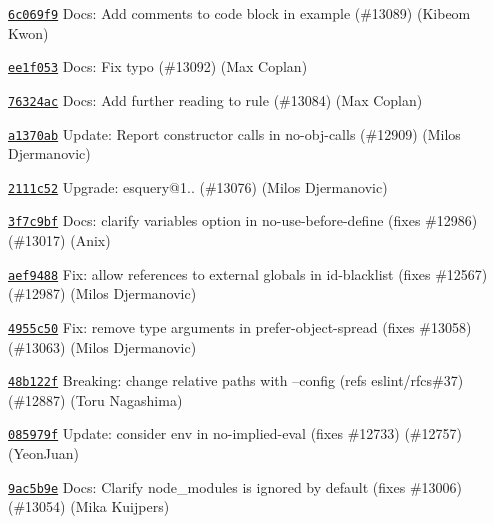 \begin{DoxyItemize}
\item \href{https://github.com/eslint/eslint/commit/6c069f907a04268b671c7f949c04a508df9d42a3}{\texttt{ {\ttfamily 6c069f9}}} Docs\+: Add comments to code block in example (\#13089) (Kibeom Kwon)
\item \href{https://github.com/eslint/eslint/commit/ee1f0531aa534ef9182cf8586f55ad82aaa55e75}{\texttt{ {\ttfamily ee1f053}}} Docs\+: Fix typo (\#13092) (Max Coplan)
\item \href{https://github.com/eslint/eslint/commit/76324ace67893c3d7e38a369114d6128df9ffb65}{\texttt{ {\ttfamily 76324ac}}} Docs\+: Add further reading to rule (\#13084) (Max Coplan)
\item \href{https://github.com/eslint/eslint/commit/a1370abed72e1fb93e601816d981fa6e46204afb}{\texttt{ {\ttfamily a1370ab}}} Update\+: Report constructor calls in no-\/obj-\/calls (\#12909) (Milos Djermanovic)
\item \href{https://github.com/eslint/eslint/commit/2111c52443e7641caad291e0daaea8e2fe6c4562}{\texttt{ {\ttfamily 2111c52}}} Upgrade\+: esquery@1.. (\#13076) (Milos Djermanovic)
\item \href{https://github.com/eslint/eslint/commit/3f7c9bf19615122fb776cdd13da532d860bd945a}{\texttt{ {\ttfamily 3f7c9bf}}} Docs\+: clarify variables option in no-\/use-\/before-\/define (fixes \#12986) (\#13017) (Anix)
\item \href{https://github.com/eslint/eslint/commit/aef9488c07d3da4becff6e8d6918824b53086d86}{\texttt{ {\ttfamily aef9488}}} Fix\+: allow references to external globals in id-\/blacklist (fixes \#12567) (\#12987) (Milos Djermanovic)
\item \href{https://github.com/eslint/eslint/commit/4955c50dc9e89b4077b28e35f065d45e89bdccd7}{\texttt{ {\ttfamily 4955c50}}} Fix\+: remove type arguments in prefer-\/object-\/spread (fixes \#13058) (\#13063) (Milos Djermanovic)
\item \href{https://github.com/eslint/eslint/commit/48b122f450b14dd27afef4c8115c69fca4f02be1}{\texttt{ {\ttfamily 48b122f}}} Breaking\+: change relative paths with --config (refs eslint/rfcs\#37) (\#12887) (Toru Nagashima)
\item \href{https://github.com/eslint/eslint/commit/085979fed9a5e24a87e4d92ee79272b59211d03f}{\texttt{ {\ttfamily 085979f}}} Update\+: consider env in no-\/implied-\/eval (fixes \#12733) (\#12757) (Yeon\+Juan)
\item \href{https://github.com/eslint/eslint/commit/9ac5b9edf06d16a9216c2c9b02bb20b6aa8ed0ab}{\texttt{ {\ttfamily 9ac5b9e}}} Docs\+: Clarify node\+\_\+modules is ignored by default (fixes \#13006) (\#13054) (Mika Kuijpers)

\end{DoxyItemize}
